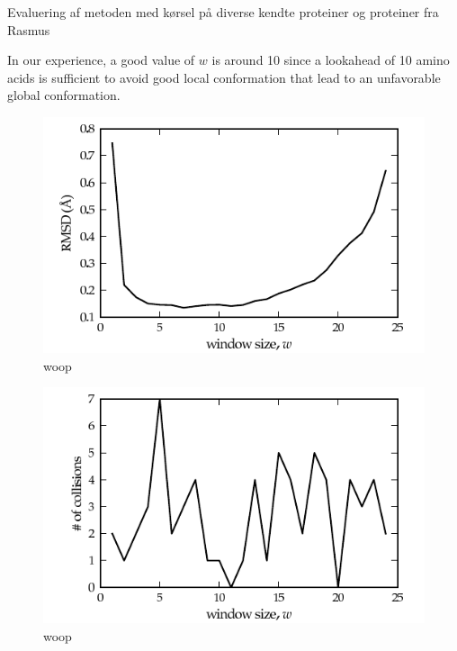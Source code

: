 Evaluering af metoden med kørsel på diverse kendte proteiner og
proteiner fra Rasmus

In our experience, a good value of $w$ is around 10 since a lookahead of 10 amino acids is sufficient to avoid good local conformation that lead to an unfavorable global conformation.
\begin{figure}[ht]
	\centering
	\hspace*{-7mm}\includegraphics[width=1.1\columnwidth]{figures/plot_rmsd}
	\caption{woop}
\end{figure}

\begin{figure}[ht]
	\centering
	\hspace*{-7mm}\includegraphics[width=1.1\columnwidth]{figures/plot_collisions}
	\caption{woop}
\end{figure}





